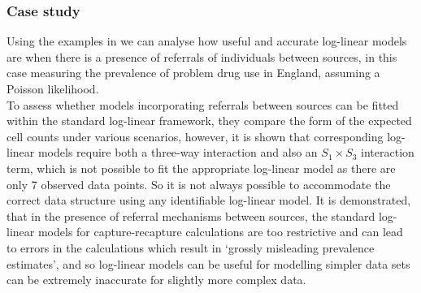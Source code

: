 \documentclass[,oneside]{article}
\numberwithin{equation}{section}
\begin{document}
\subsubsection{Case study}
Using the examples in \cite{Ap87} we can analyse how useful and accurate log-linear models are when there is a presence of referrals of individuals between sources, in this case measuring the prevalence of problem drug use in England, assuming a Poisson likelihood.\\
To assess whether models incorporating referrals between sources can be fitted within the standard log-linear framework, they compare the form of the expected cell counts under various scenarios, however, it is shown that corresponding log-linear models require both a three-way interaction and also an $S_1\times S_3$ interaction term, which is not possible to fit the appropriate log-linear model as there are only 7 observed data points. So it is not always possible to accommodate the correct data structure using any identifiable log-linear model.
It is demonstrated, that in the presence of referral mechanisms between sources, the standard log-linear models for capture-recapture calculations are too restrictive and can lead to errors in the calculations which result in ‘grossly misleading prevalence estimates’, and so log-linear models can be useful for modelling simpler data sets can be extremely inaccurate for slightly more complex data.
\end{document}
